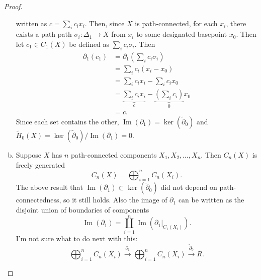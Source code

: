 \documentclass{article}
\newcommand{\fn}[3]{#1 \colon #2 \rightarrow #3}
\DeclareMathOperator{\im}{Im}
\begin{document}
\begin{proof}
\begin{enumerate}[a.]
    written as $c = \sum_i c_i x_i$. Then, since $X$ is path-connected,
    for each $x_i$, there exists a path path $\fn{\sigma_i}{\Delta_1}{X}$ from
    $x_i$ to some designated basepoint $x_0$.
    Then let $c_1 \in C_1(X)$ be defined as $\sum_i c_i \sigma_i$. Then \begin{align*}
      \partial_1(c_1)
      &= \partial_1\!\!\left(\sum_i c_i \sigma_i\right) \\
      &= \sum_i c_i (x_i - x_0) \\
      &= \sum_i c_i x_i - \sum_i c_i x_0 \\
      &= \underbrace{\sum_i c_i x_i}_c - \underbrace{\left(\sum_i c_i\right)}_0 x_0 \\
      &= c.
    \end{align*}
    Since each set contains the other,
    $\im(\partial_1) = \ker(\widetilde \partial_0)$ and
    $\widetilde H_0(X) = \ker(\widetilde \partial_0)/\im(\partial_1) = 0$.
    \item Suppose $X$ has $n$ path-connected components $X_1, X_2, \hdots, X_n$.
    Then $C_n(X)$ is freely generated \[
      C_n(X) = \bigoplus_{i=1}^n C_n(X_i).
    \] The above result that
    $\im(\partial_1) \subset \ker(\widetilde\partial_0)$ did not depend on
    path-connectedness, so it still holds.
    Also the image of $\partial_1$ can be written as the disjoint union of
    boundaries of components \[
      \im(\partial_1) = \coprod_{i=1}^n \im(\partial_1|_{C_1(X_i)}).
    \]
    I'm not sure what to do next with this: \[
      \bigoplus_{i=1}^n C_n(X_i) \xrightarrow{\partial_1}
      \bigoplus_{i=1}^n C_n(X_i) \xrightarrow{\widetilde\partial_0}
      R.
    \]
  \end{enumerate}
\end{proof}
\end{document}

